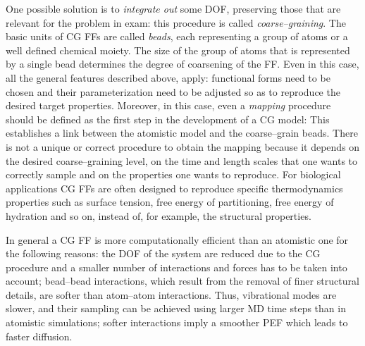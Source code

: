 One possible solution is to \textit{integrate out} some \ac{DOF}, preserving those that are relevant for the problem in exam: this procedure is called \textit{coarse--graining}. The basic units of \ac{CG} \acp{FF} are called \textit{beads}, each representing a group of atoms or a well defined chemical moiety. The size of the group of atoms that is represented by a single bead determines the degree of coarsening of the \ac{FF}. Even in this case, all the general features described above, apply: functional forms need to be chosen and their parameterization need to be adjusted so as to reproduce the desired target properties. Moreover, in this case, even a \textit{mapping} procedure should be defined as the first step in the development of a \ac{CG} model: This establishes a link between the atomistic model and the coarse--grain beads. There is not a unique or correct procedure to obtain the mapping because it depends on the desired coarse--graining level, on the time and length scales that one wants to correctly sample and on the properties one wants to reproduce. For biological applications \ac{CG} \acp{FF} are often designed to reproduce specific thermodynamics properties such as surface tension, free energy of partitioning, free energy of hydration and so on, instead of, for example, the structural properties.

In general a \ac{CG} \ac{FF} is more computationally efficient than an atomistic one for the following reasons: the \ac{DOF} of the system are reduced due to the \ac{CG} procedure and a smaller number of interactions and forces has to be taken into account; bead--bead interactions, which result from the removal of finer structural details, are softer than atom--atom interactions. Thus, vibrational modes are slower, and their sampling can be achieved using larger \ac{MD} time steps than in atomistic simulations; softer interactions imply a smoother \ac{PEF} which leads to faster diffusion.

